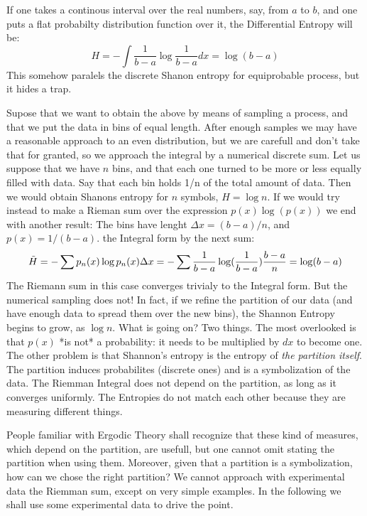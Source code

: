 \documentclass{article}
\begin{document}
If one takes a continous interval over the real numbers, say, from $a$ to $b$, and one puts a flat probabilty distribution function over it, the Differential Entropy will be:
$$
H=-\int \frac{1}{b-a} \log \frac{1}{b-a} d x = \log (b-a)
$$
This somehow paralels the discrete Shanon entropy for equiprobable process, but it hides a trap.

Supose that we want to obtain the above by means of sampling a process, and that we put the data in bins of
equal length. After enough samples we may have a reasonable approach to an even distribution, but we are carefull
and don't take that for granted, so we approach the integral by a numerical discrete sum. Let us suppose that we have $n$ bins, and that each one turned to be more or less equally filled with data. Say that each bin holds 1/n of the total amount of data. Then we would obtain Shanons entropy for $n$ symbols, $H=\log n$. If we would try instead to make a Rieman sum over the expression $ p(x) \log (p(x))$ we end with another result: The bins have lenght $\Delta x= (b-a)/n$, and $p(x)=1/(b-a)$. 
the Integral form by the next sum:
$$
\tilde{H}=-\sum p_n(x) \log p_n(x) \Delta x \\
=-\sum \frac{1}{b-a}\log (\frac{1}{b-a}) \frac{b-a}{n} \\
= \log (b-a)
$$
The Riemann sum in this case converges trivialy to the Integral form. But the numerical sampling does not! In fact, if we refine the partition of our data (and have enough data to spread them over the new bins), the Shannon Entropy begins to grow, as $\log n$. What is going on? Two things. The most overlooked is that $p(x)$ *is not* a probability: it needs to be multiplied by $dx$ to become one. The other problem is that  Shannon's entropy is the entropy of \emph{the partition itself}. The partition induces probabilites (discrete ones) and is a symbolization of the data. The Riemman Integral does not depend on the partition, as long as it converges uniformly. The Entropies do not match each other because they are measuring different things.

People familiar with Ergodic Theory shall recognize that these kind of measures, which depend on the partition, are usefull, but one cannot omit stating the partition when using them. Moreover, given that a partition is a symbolization, how can we chose the right partition? We cannot approach with experimental data the Riemman sum, except on very simple examples. 
In the following we shall use some experimental data
to drive the point.
\end{document}
